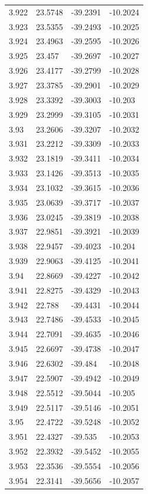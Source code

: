 \begin{tabular}{llll}
3.922 & 23.5748 & -39.2391 & -10.2024 \\
3.923 & 23.5355 & -39.2493 & -10.2025 \\
3.924 & 23.4963 & -39.2595 & -10.2026 \\
3.925 & 23.457 & -39.2697 & -10.2027 \\
3.926 & 23.4177 & -39.2799 & -10.2028 \\
3.927 & 23.3785 & -39.2901 & -10.2029 \\
3.928 & 23.3392 & -39.3003 & -10.203 \\
3.929 & 23.2999 & -39.3105 & -10.2031 \\
3.93 & 23.2606 & -39.3207 & -10.2032 \\
3.931 & 23.2212 & -39.3309 & -10.2033 \\
3.932 & 23.1819 & -39.3411 & -10.2034 \\
3.933 & 23.1426 & -39.3513 & -10.2035 \\
3.934 & 23.1032 & -39.3615 & -10.2036 \\
3.935 & 23.0639 & -39.3717 & -10.2037 \\
3.936 & 23.0245 & -39.3819 & -10.2038 \\
3.937 & 22.9851 & -39.3921 & -10.2039 \\
3.938 & 22.9457 & -39.4023 & -10.204 \\
3.939 & 22.9063 & -39.4125 & -10.2041 \\
3.94 & 22.8669 & -39.4227 & -10.2042 \\
3.941 & 22.8275 & -39.4329 & -10.2043 \\
3.942 & 22.788 & -39.4431 & -10.2044 \\
3.943 & 22.7486 & -39.4533 & -10.2045 \\
3.944 & 22.7091 & -39.4635 & -10.2046 \\
3.945 & 22.6697 & -39.4738 & -10.2047 \\
3.946 & 22.6302 & -39.484 & -10.2048 \\
3.947 & 22.5907 & -39.4942 & -10.2049 \\
3.948 & 22.5512 & -39.5044 & -10.205 \\
3.949 & 22.5117 & -39.5146 & -10.2051 \\
3.95 & 22.4722 & -39.5248 & -10.2052 \\
3.951 & 22.4327 & -39.535 & -10.2053 \\
3.952 & 22.3932 & -39.5452 & -10.2055 \\
3.953 & 22.3536 & -39.5554 & -10.2056 \\
3.954 & 22.3141 & -39.5656 & -10.2057 \\

\end{tabular}
